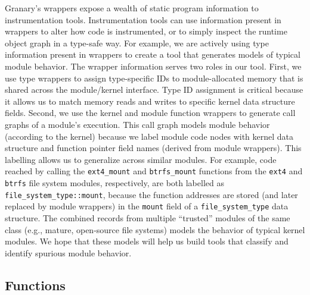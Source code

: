 \documentclass[preprint]{sigplanconf}
\begin{document}
Granary's wrappers expose a wealth of static program information to instrumentation tools. Instrumentation tools can use information present in wrappers to alter how code is instrumented, or to simply inspect the runtime object graph in a type-safe way. For example, we are actively using type information present in wrappers to create a tool that generates models of typical module behavior. The wrapper information serves two roles in our tool. First, we use type wrappers to assign type-specific IDs to module-allocated memory that is shared across the module/kernel interface. Type ID assignment is critical because it allows us to match memory reads and writes to specific kernel data structure fields. Second, we use the kernel and module function wrappers to generate call graphs of a module's execution. This call graph models module behavior (according to the kernel) because we label module code nodes with kernel data structure and function pointer field names (derived from module wrappers). This labelling allows us to generalize across similar modules. For example, code reached by calling the \texttt{ext4\_mount} and \texttt{btrfs\_mount} functions from the \texttt{ext4} and \texttt{btrfs} file system modules, respectively, are both labelled as \texttt{file\_system\_type::mount}, because the function addresses are stored (and later replaced by module wrappers) in the \texttt{mount} field of a \texttt{file\_system\_type} data structure. The combined records from multiple ``trusted'' modules of the same class (e.g., mature, open-source file systems) models the behavior of typical kernel modules. We hope that these models will help us build tools that classify and identify spurious module behavior. 

\subsection{Functions}\label{sec:function_wrapper}
\end{document}
